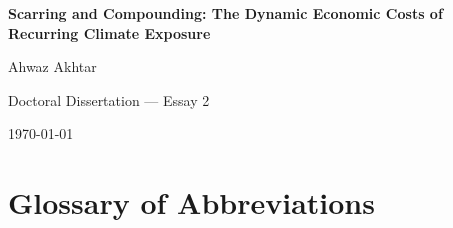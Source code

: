 \documentclass[a4paper,11pt]{article}
\begin{document}
\begin{titlepage}
\linespread{1}
\begin{center}
\vspace*{2cm}
\LARGE\textbf{Scarring and Compounding: The Dynamic Economic Costs of Recurring Climate Exposure}

\vspace{0.6cm}
\Large Ahwaz Akhtar

\vspace{0.8cm}
\large Doctoral Dissertation --- Essay 2

\vspace{0.4cm}
\today

\vspace{0.4cm}
\hrulefill
\vspace{0.4cm}

\end{center}
\begin{abstract}\noindent\footnotesize Whether a changing climate raises costs over the long run depends on what happens once a shock ends: whether the damage reverses, leaves a one-time scar, or compounds as shocks recur. Using a U.S. county panel from 2011 to 2023, I decompose each climate shock into onset, persistence, and exit; test whether entering and leaving a shock offset one another; and estimate how outcomes respond to accumulated shock-years, checking the results against a staggered event-study estimator. The dynamics are shock-specific. Drought debt scars: the two-year onset-exit asymmetry in the medical-debt share is +0.019 (p < 0.001), about 45 percent of a typical annual movement. This is a scar that fades by the fourth year after exit and partly reflects out-migration. Cold, on the other hand, compounds: counties at 10+ cumulative cold-years have employment roughly 5,500 lower than counties having 1-3 years of exposure, and the gap approaches 5,000 jobs a decade after onset in the event study. Heat saturates into a level difference, and chronic extreme drought is extremely rare. The horizon over which climate raises costs is itself hazard-specific, so single-year exposure measures understate the burden of recurring cold.\end{abstract}
\noindent\hrulefill
\end{titlepage}

\section*{Glossary of Abbreviations}

\clearpage
\FloatBarrier
\end{document}
